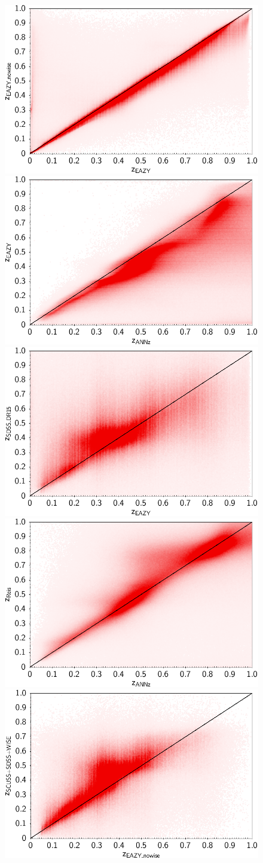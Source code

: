 \documentclass[apj,iop]{emulateapj}
\begin{document}
\begin{figure}[!ht]
\centering
\includegraphics[width=0.45\linewidth]{figures/photoz/eazy_eazy_nowise.png}
\includegraphics[width=0.45\linewidth]{figures/photoz/annz_eazy.png}
\newline
\includegraphics[width=0.45\linewidth]{figures/photoz/eazy_dr15.png}
\includegraphics[width=0.45\linewidth]{figures/photoz/annz_reis.png}
\newline
\includegraphics[width=0.45\linewidth]{figures/photoz/eazy_nowise_scuss.png}

\end{figure}
\end{document}
